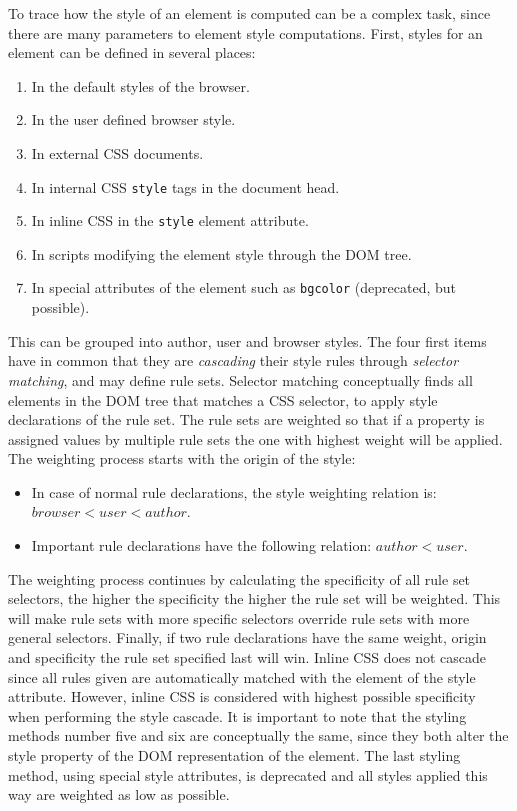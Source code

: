 \documentclass[a4paper,11pt]{kth-mag}
\newcommand{\code}[1]{\texttt{#1}}
\begin{document}
        To trace how the style of an \gls{element} is computed can be a complex task, since there are many parameters to \gls{element} style computations.
        First, styles for an \gls{element} can be defined in several places:
        \begin{enumerate}
          \item In the default styles of the \gls{browser}.
          \item In the user defined \gls{browser} style.
          \item In external \gls{CSS} \glspl{document}.
          \item In internal \gls{CSS} \code{style} tags in the \gls{document} head.
          \item In inline \gls{CSS} in the \code{style} \gls{element} attribute.
          \item In scripts modifying the \gls{element} style through the \gls{DOM} tree.
          \item In special attributes of the \gls{element} such as \code{bgcolor} (deprecated, but possible).
        \end{enumerate}
        This can be grouped into author, user and \gls{browser} styles.
        The four first items have in common that they are \emph{cascading} their style rules through \emph{selector matching}, and may define rule sets.
        Selector matching conceptually finds all \glspl{element} in the \gls{DOM} tree that matches a \gls{CSS} selector, to apply style declarations of the rule set.
        The rule sets are weighted so that if a property is assigned values by multiple rule sets the one with highest weight will be applied.
        The weighting process starts with the origin of the style:
        \begin{itemize}
          \item In case of normal rule declarations, the style weighting relation is: $browser < user < author$.
          \item Important rule declarations have the following relation: $author < user$.
        \end{itemize}
        The weighting process continues by calculating the \gls{specificity} of all rule set selectors, the higher the \gls{specificity} the higher the rule set will be weighted.
        This will make rule sets with more specific selectors override rule sets with more general selectors.
        Finally, if two rule declarations have the same weight, origin and \gls{specificity} the rule set specified last will win.
        Inline \gls{CSS} does not cascade since all rules given are automatically matched with the \gls{element} of the style attribute.
        However, inline \gls{CSS} is considered with highest possible \gls{specificity} when performing the style cascade.
        It is important to note that the styling methods number five and six are conceptually the same, since they both alter the style property of the \gls{DOM} representation of the \gls{element}.
        The last styling method, using special style attributes, is deprecated and all styles applied this way are weighted as low as possible.
\end{document}
